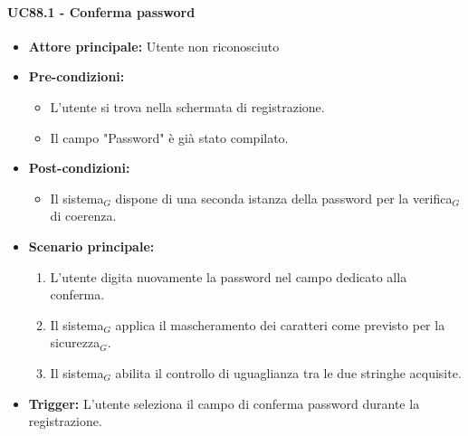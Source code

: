 \documentclass[a4paper, 10pt]{article}
\begin{document}
\paragraph{UC88.1 - Conferma password}
\hypertarget{uc:88.1}{}
\begin{itemize}
    \item \textbf{Attore principale:} Utente non riconosciuto
    \item \textbf{Pre-condizioni:} 
        \begin{itemize}
            \item L'utente si trova nella schermata di registrazione.
            \item Il campo "Password" è già stato compilato.
        \end{itemize}
    \item \textbf{Post-condizioni:} 
        \begin{itemize}
            \item Il sistema$_G$ dispone di una seconda istanza della password per la verifica$_G$ di coerenza.
        \end{itemize}
    \item \textbf{Scenario principale:}
        \begin{enumerate}
            \item L'utente digita nuovamente la password nel campo dedicato alla conferma.
            \item Il sistema$_G$ applica il mascheramento dei caratteri come previsto per la sicurezza$_G$.
            \item Il sistema$_G$ abilita il controllo di uguaglianza tra le due stringhe acquisite.
        \end{enumerate}
    \item \textbf{Trigger:} L'utente seleziona il campo di conferma password durante la registrazione.
\end{itemize}
\end{document}
